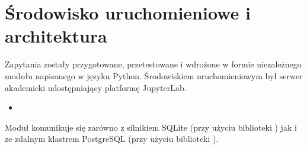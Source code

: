 \documentclass[letterpaper,10pt,polish]{sphinxmanual}
\begin{document}
\section{Środowisko uruchomieniowe i architektura}
\label{\detokenize{rozdzia_u0142_5/BD_Zapytania/index:srodowisko-uruchomieniowe-i-architektura}}
\sphinxAtStartPar
Zapytania zostały przygotowane, przetestowane i wdrożone w formie niezależnego modułu napisanego w języku Python. Środowiskiem uruchomieniowym był serwer akademicki udostępniający platformę JupyterLab.
\begin{itemize}
\item {} 
\sphinxAtStartPar
{} 

\end{itemize}

\sphinxAtStartPar
Moduł komunikuje się zarówno z silnikiem SQLite (przy użyciu biblioteki ) jak i ze zdalnym klastrem PostgreSQL (przy użyciu biblioteki ).
\end{document}
